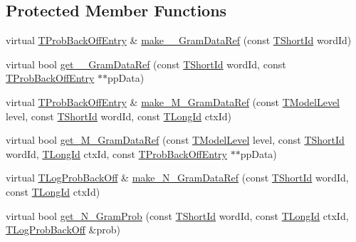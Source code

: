 \subsection*{Protected Member Functions}
\begin{DoxyCompactItemize}
\item 
virtual \hyperlink{structuva_1_1smt_1_1tries_1_1_t_prob_back_off_entry}{T\+Prob\+Back\+Off\+Entry} \& \hyperlink{classuva_1_1smt_1_1tries_1_1_w2_c_hybrid_trie_a9b2a2d77e2dd74f72c8e3efcdf5eef91}{make\+\_\+\_\+\+Gram\+Data\+Ref} (const \hyperlink{namespaceuva_1_1smt_1_1hashing_adcf22e1982ad09d3a63494c006267469}{T\+Short\+Id} word\+Id)
\item 
virtual bool \hyperlink{classuva_1_1smt_1_1tries_1_1_w2_c_hybrid_trie_ad5d06f2b508ce32d5b7fb6e2057b7ede}{get\+\_\+\_\+\+Gram\+Data\+Ref} (const \hyperlink{namespaceuva_1_1smt_1_1hashing_adcf22e1982ad09d3a63494c006267469}{T\+Short\+Id} word\+Id, const \hyperlink{structuva_1_1smt_1_1tries_1_1_t_prob_back_off_entry}{T\+Prob\+Back\+Off\+Entry} $\ast$$\ast$pp\+Data)
\item 
virtual \hyperlink{structuva_1_1smt_1_1tries_1_1_t_prob_back_off_entry}{T\+Prob\+Back\+Off\+Entry} \& \hyperlink{classuva_1_1smt_1_1tries_1_1_w2_c_hybrid_trie_ad9dd07f5dca7a6f0b961463c17dc3d86}{make\+\_\+\+M\+\_\+\+Gram\+Data\+Ref} (const \hyperlink{namespaceuva_1_1smt_1_1tries_a20577a44b3a42d26524250634379b7cb}{T\+Model\+Level} level, const \hyperlink{namespaceuva_1_1smt_1_1hashing_adcf22e1982ad09d3a63494c006267469}{T\+Short\+Id} word\+Id, const \hyperlink{namespaceuva_1_1smt_1_1hashing_a5992ac0dea0fb3226fb403ede09fad55}{T\+Long\+Id} ctx\+Id)
\item 
virtual bool \hyperlink{classuva_1_1smt_1_1tries_1_1_w2_c_hybrid_trie_ad7c70b9f64fb4439e6d144bf7e39618d}{get\+\_\+\+M\+\_\+\+Gram\+Data\+Ref} (const \hyperlink{namespaceuva_1_1smt_1_1tries_a20577a44b3a42d26524250634379b7cb}{T\+Model\+Level} level, const \hyperlink{namespaceuva_1_1smt_1_1hashing_adcf22e1982ad09d3a63494c006267469}{T\+Short\+Id} word\+Id, \hyperlink{namespaceuva_1_1smt_1_1hashing_a5992ac0dea0fb3226fb403ede09fad55}{T\+Long\+Id} ctx\+Id, const \hyperlink{structuva_1_1smt_1_1tries_1_1_t_prob_back_off_entry}{T\+Prob\+Back\+Off\+Entry} $\ast$$\ast$pp\+Data)
\item 
virtual \hyperlink{namespaceuva_1_1smt_1_1tries_acd0660255dd9ef5d644f01de49102750}{T\+Log\+Prob\+Back\+Off} \& \hyperlink{classuva_1_1smt_1_1tries_1_1_w2_c_hybrid_trie_a79b65560fba7b15a8124e2f58af580af}{make\+\_\+\+N\+\_\+\+Gram\+Data\+Ref} (const \hyperlink{namespaceuva_1_1smt_1_1hashing_adcf22e1982ad09d3a63494c006267469}{T\+Short\+Id} word\+Id, const \hyperlink{namespaceuva_1_1smt_1_1hashing_a5992ac0dea0fb3226fb403ede09fad55}{T\+Long\+Id} ctx\+Id)
\item 
virtual bool \hyperlink{classuva_1_1smt_1_1tries_1_1_w2_c_hybrid_trie_a2cfef7b9bcc92e35ed953063d14eb4ce}{get\+\_\+\+N\+\_\+\+Gram\+Prob} (const \hyperlink{namespaceuva_1_1smt_1_1hashing_adcf22e1982ad09d3a63494c006267469}{T\+Short\+Id} word\+Id, const \hyperlink{namespaceuva_1_1smt_1_1hashing_a5992ac0dea0fb3226fb403ede09fad55}{T\+Long\+Id} ctx\+Id, \hyperlink{namespaceuva_1_1smt_1_1tries_acd0660255dd9ef5d644f01de49102750}{T\+Log\+Prob\+Back\+Off} \&prob)
\end{DoxyCompactItemize}
